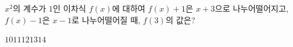 $x^2$의 계수가 $1$인 이차식 $f(x)$에 대하여 $f(x)+1$은 $x+3$으로 나누어떨어지고, $f(x)-1$은 $x-1$로 나누어떨어질 때, $f(3)$의 값은?
\begin{choices32}{$10$}{$11$}{$12$}{$13$}{$14$}\end{choices32}
